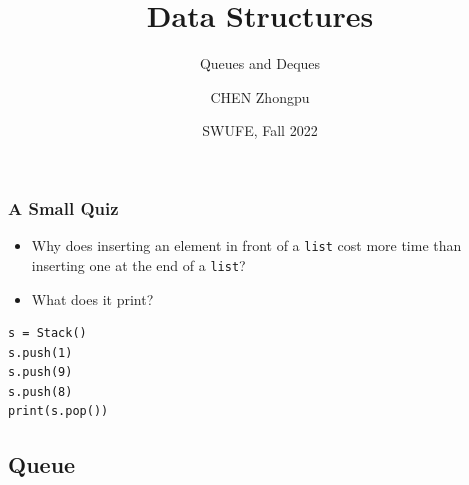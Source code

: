 \documentclass[aspectratio=169, 14pt]{beamer}
\title[Data Structures] %
{Data Structures}
\subtitle{Queues and Deques}
\author[CHEN Zhongpu] %
{CHEN Zhongpu}
\institute[] %
{
  School of Computing and Artificial Intelligence \\
  \href{mailto:zpchen@swufe.edu.cn}{zpchen@swufe.edu.cn}
}
\date[] %
{SWUFE, Fall 2022}
\begin{document}
\frame{\titlepage}

\begin{frame}[fragile]
    \frametitle{A Small Quiz}
    \begin{itemize}
        \item Why does inserting an element in front of a \texttt{list} cost more time than inserting one at the end of a \texttt{list}?
    \end{itemize}
\begin{itemize}
    \item What does it print?
\end{itemize}
    
\begin{verbatim}
s = Stack()
s.push(1)   
s.push(9)
s.push(8)
print(s.pop())
\end{verbatim}
\end{frame}

{
    \begin{frame}
        \section{\textcolor{darkmidnightblue}{Queue}}
    \end{frame}
}
\end{document}
